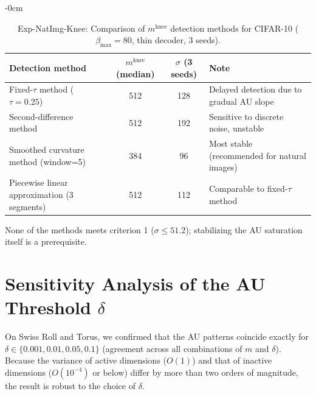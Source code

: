\documentclass[make,article,submit,pdftex,moreauthors]{Definitions/mdpi}
\newcommand{\mknee}{m^{\mathrm{knee}}}
\begin{document}
\begin{table}[H]
\begin{adjustwidth}{-\extralength}{0cm}
\centering
\caption{Exp-NatImg-Knee: Comparison of $\mknee$ detection methods for CIFAR-10 ($\beta_\mathrm{max}=80$, thin decoder, 3 seeds).}
\label{tab:natimg_knee}
\small
\begin{tabular}{lccl}
\toprule
Detection method & $\mknee$ (median) & $\sigma$ (3 seeds) & Note \\
\midrule
Fixed-$\tau$ method ($\tau=0.25$) & 512 & 128 & Delayed detection due to gradual AU slope \\
Second-difference method & 512 & 192 & Sensitive to discrete noise, unstable \\
Smoothed curvature method (window=5) & 384 & 96 & Most stable (recommended for natural images) \\
Piecewise linear approximation (3 segments) & 512 & 112 & Comparable to fixed-$\tau$ method \\
\bottomrule
\end{tabular}
\end{adjustwidth}
\end{table}

None of the methods meets criterion 1 ($\sigma \leq 51.2$); stabilizing the AU saturation itself is a prerequisite.

\section[\appendixname~\thesection]{Sensitivity Analysis of the AU Threshold $\delta$}\label{app:delta}

On Swiss Roll and Torus, we confirmed that the AU patterns coincide exactly for
$\delta \in \{0.001, 0.01, 0.05, 0.1\}$ (agreement across all combinations of $m$ and $\delta$).
Because the variance of active dimensions ($O(1)$) and that of inactive dimensions ($O(10^{-4})$ or below)
differ by more than two orders of magnitude, the result is robust to the choice of $\delta$.
\end{document}
